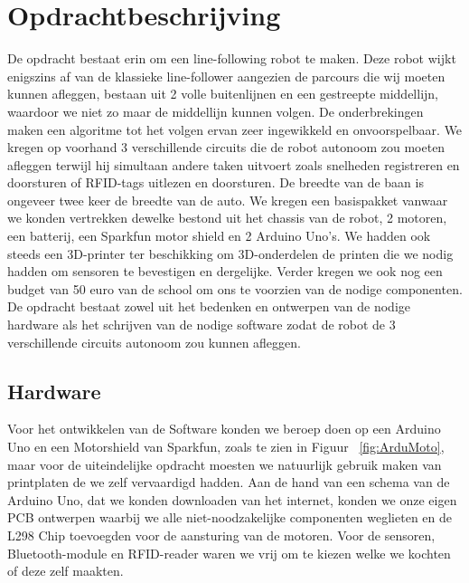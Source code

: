 \chapter{Opdrachtbeschrijving}
\label{chap:Opdrachtbeschrijving}
De opdracht bestaat erin om een line-following robot te maken. Deze robot wijkt enigszins af van de klassieke line-follower aangezien de parcours die wij moeten kunnen afleggen, bestaan uit 2 volle buitenlijnen en een gestreepte middellijn, waardoor we niet zo maar de middellijn kunnen volgen. De onderbrekingen maken een algoritme tot het volgen ervan zeer ingewikkeld en onvoorspelbaar. We kregen op voorhand 3 verschillende circuits die de robot autonoom zou moeten afleggen terwijl hij simultaan andere taken uitvoert zoals snelheden registreren en doorsturen of RFID-tags uitlezen en doorsturen. De breedte van de baan is ongeveer twee keer de breedte van de auto. We kregen een basispakket vanwaar we konden vertrekken dewelke bestond uit het chassis van de robot, 2 motoren, een batterij, een Sparkfun motor shield en 2 Arduino Uno's. We hadden ook steeds een 3D-printer ter beschikking om 3D-onderdelen de printen die we nodig hadden om sensoren te bevestigen en dergelijke. Verder kregen we ook nog een budget van 50 euro van de school om ons te voorzien van de nodige componenten. De opdracht bestaat zowel uit het bedenken en ontwerpen van de nodige hardware als het schrijven van de nodige software zodat de robot de 3 verschillende circuits autonoom zou kunnen afleggen.
\section{Hardware}
Voor het ontwikkelen van de Software konden we beroep doen op een Arduino Uno en een Motorshield van Sparkfun, zoals te zien in Figuur ~\ref{fig:ArduMoto}, maar voor de uiteindelijke opdracht moesten we natuurlijk gebruik maken van printplaten de we zelf vervaardigd hadden. Aan de hand van een schema van de Arduino Uno, dat we konden downloaden van het internet, konden we onze eigen PCB ontwerpen waarbij we alle niet-noodzakelijke componenten weglieten en de L298 Chip toevoegden voor de aansturing van de motoren. Voor de sensoren, Bluetooth-module en RFID-reader waren we vrij om te kiezen welke we kochten of deze zelf maakten.




